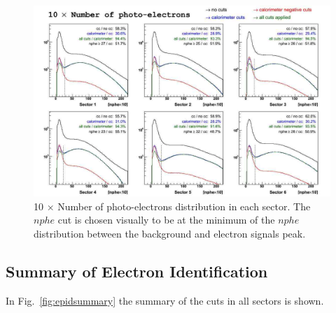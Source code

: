 \clearpage\newpage
\begin{landscape}
\begin{figure}[ht]
  \centering
		\includegraphics[width=1.35\textwidth]{img/npe_each_sector.jpg}
		\caption{ 10 $\times$ Number of photo-electrons distribution in each sector.
                The $nphe$ cut is chosen visually to be at the minimum of 
                the $nphe$ distribution between the background and electron signals peak.}
 		\label{fig:cccut}
\end{figure}
\end{landscape}




\subsection{Summary of Electron Identification }
In Fig.~\ref{fig:epidsummary} the summary of the cuts in all sectors is shown.

